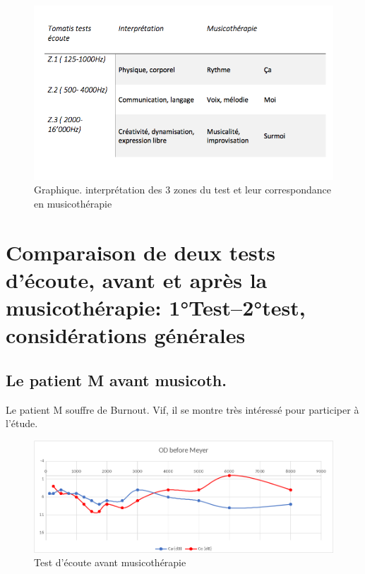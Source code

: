  

\begin{figure}
	\centering
	\includegraphics[width=0.7\linewidth]{images/testinterpmusico}
	\caption[ L'interprétation des 3 zones et leur correspondance
        en musicothérapie]{Graphique. interprétation des 3 zones du
          test et leur correspondance en musicothérapie}
       
	\label{graphiquecolonnetestmusico}
      \end{figure}











      


  

\section{Comparaison de deux tests d'écoute, avant et après la musicothérapie: 1°Test--2°test, considérations générales}
	
 	
\subsection{Le patient M avant musicoth.}

 	Le patient M souffre de Burnout. Vif, il se montre très
        intéressé pour participer à l'étude.
 
 	
 	\begin{figure}[tbh]
 		\centering
 		\includegraphics[width=0.7\linewidth]{images/clinique/od_before_meyer.png}
 		\caption{Test d'écoute avant musicothérapie}
 		\label{fig:odbeforemeyer}
 	\end{figure}
 	
